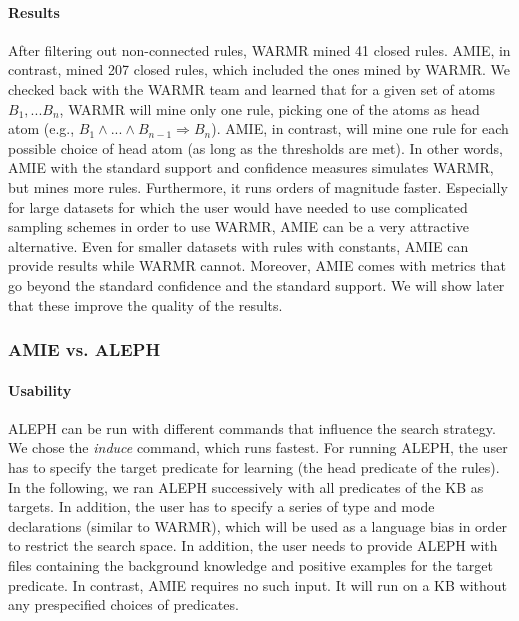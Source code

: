 \paragraph{Results} After filtering out non-connected rules, WARMR mined 41 closed rules. AMIE, in contrast, mined 207 closed rules, which included the ones mined by WARMR. 
We checked back with the WARMR team and learned that for a given set of atoms $B_1, ... B_n$, WARMR will mine only one rule, picking one of the atoms as head atom (e.g., $B_1 \wedge ... \wedge B_{n-1} \Rightarrow B_n$). AMIE, in contrast, will mine one rule for each possible choice of head atom (as long as the thresholds are met). In other words, AMIE with the standard support and confidence measures simulates WARMR, but mines more rules. Furthermore, it runs orders of magnitude faster. Especially for large datasets for which the user would have needed to use complicated sampling schemes in order to use WARMR, AMIE can be a very attractive alternative. Even for smaller datasets with rules with constants, AMIE can provide results while WARMR cannot. Moreover, AMIE comes with metrics that go beyond the standard confidence and the standard support. We will show later that these improve the quality of the results.

\subsubsection{AMIE vs. ALEPH}

\paragraph{Usability} ALEPH can be run with different commands that influence the search strategy. We chose the \emph{induce} command, which runs fastest. 
For running ALEPH, the user has to specify the target predicate for learning (the head predicate of the rules). 
In the following, we ran ALEPH successively with all predicates of the KB as targets. 
In addition, the user has to specify a series of type and mode declarations (similar to WARMR), which will be used as a language bias in order to restrict the search space. 
In addition, the user needs to provide ALEPH with files containing the background knowledge and positive examples for the target predicate. 
In contrast, AMIE requires no such input. It will run on a KB without any prespecified choices of predicates.\\


